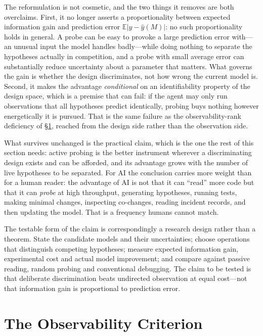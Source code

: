 The reformulation is not cosmetic, and the two things it removes are both overclaims. First, it no
longer asserts a proportionality between expected information gain and prediction error
$\mathbb{E}|y - \hat{y}(M)|$: no such proportionality holds in general. A probe can be easy to
provoke a large prediction error with---an unusual input the model handles badly---while doing
nothing to separate the hypotheses actually in competition, and a probe with small average error can
substantially reduce uncertainty about a parameter that matters. What governs the gain is whether the
design discriminates, not how wrong the current model is. Second, it makes the advantage
\emph{conditional} on an identifiability property of the design space, which is a premise that can
fail: if the agent may only run observations that all hypotheses predict identically, probing buys
nothing however energetically it is pursued. That is the same failure as the observability-rank
deficiency of \S\ref{sec:observability}, reached from the design side rather than the observation
side.

What survives unchanged is the practical claim, which is the one the rest of this section needs:
active probing is the better instrument wherever a discriminating design exists and can be afforded,
and its advantage grows with the number of live hypotheses to be separated. For AI the conclusion
carries more weight than for a human reader: the advantage of AI is not that it can ``read'' more
code but that it can \emph{probe} at high throughput, generating hypotheses, running tests,
making minimal changes, inspecting co-changes, reading incident records, and then updating the
model. That is a frequency humans cannot match.

The testable form of the claim is correspondingly a research design rather than a theorem. State the
candidate models and their uncertainties; choose operations that distinguish competing hypotheses;
measure expected information gain, experimental cost and actual model improvement; and compare
against passive reading, random probing and conventional debugging. The claim to be tested is that
deliberate discrimination beats undirected observation at equal cost---not that information gain is
proportional to prediction error.

\section{The Observability Criterion}\label{sec:observability}

